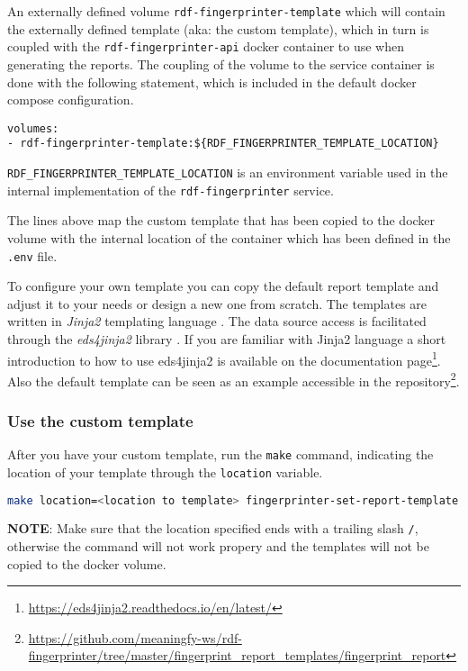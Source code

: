 		An externally defined volume \texttt{rdf-fingerprinter-template} which will contain the externally defined template (aka: the custom template), which in turn is coupled with the \texttt{rdf-fingerprinter-api} docker container to use when generating the reports. The coupling of the volume to the service container is done with the following statement, which is included in the default docker compose configuration. 
		
		\begin{lstlisting}[]
volumes:
- rdf-fingerprinter-template:${RDF_FINGERPRINTER_TEMPLATE_LOCATION}
		\end{lstlisting}

		\texttt{RDF\_FINGERPRINTER\_TEMPLATE\_LOCATION} is an environment variable used in the internal implementation of the \texttt{rdf-fingerprinter} service.

		The lines above map the custom template that has been copied to the docker volume with the internal location of the container which has been defined in the \texttt{.env} file.

		To configure your own template you can copy the default report template and adjust it to your needs or design a new one from scratch. 
		The templates are written in \textit{Jinja2} templating language \citep{jinja2}. The data source access is facilitated through the \textit{eds4jinja2} library \citep{eds4jinja2}. If you are familiar with Jinja2 language a short introduction to how to use eds4jinja2 is available on the documentation page\footnote{\url{https://eds4jinja2.readthedocs.io/en/latest/}}. Also the default template can be seen as an example accessible in the repository\footnote{\url{https://github.com/meaningfy-ws/rdf-fingerprinter/tree/master/fingerprint_report_templates/fingerprint_report}}.

		\subsubsection{Use the custom template}
		After you have your custom template, run the \texttt{make} command, indicating the location of your template through the \texttt{location} variable.
		\begin{lstlisting}[language=bash]
make location=<location to template> fingerprinter-set-report-template
		\end{lstlisting}

		\textbf{NOTE}: Make sure that the location specified ends with a trailing slash \texttt{/}, otherwise the command will not work propery and the templates will not be copied to the docker volume.

